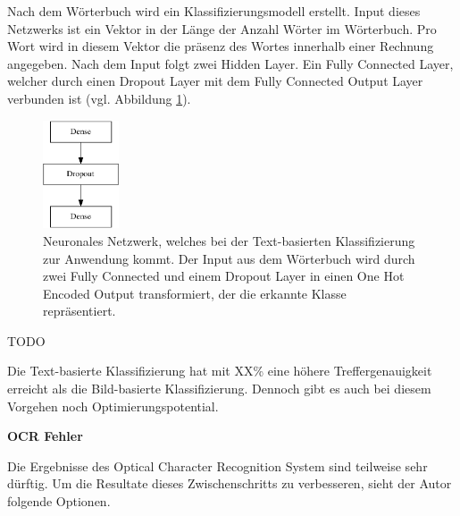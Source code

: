 Nach dem Wörterbuch wird ein Klassifizierungsmodell erstellt. Input dieses Netzwerks ist ein Vektor in der Länge der Anzahl Wörter im Wörterbuch. Pro Wort wird in diesem Vektor die präsenz des Wortes innerhalb einer Rechnung angegeben. Nach dem Input folgt zwei Hidden Layer. Ein Fully Connected Layer, welcher durch einen Dropout Layer mit dem Fully Connected Output Layer verbunden ist (vgl. Abbildung \ref{text-classification-model}). 

\begin{figure} 
    \caption{Neuronales Netzwerk, welches bei der Text-basierten Klassifizierung zur Anwendung kommt. Der Input aus dem Wörterbuch wird durch zwei Fully Connected und einem Dropout Layer in einen One Hot Encoded Output transformiert, der die erkannte Klasse repräsentiert.}
    \label{text-classification-model}
    \centering
    \includegraphics[width=0.2\textwidth]{graphics/text-classification/model.pdf}
\end{figure}


TODO




Die Text-basierte Klassifizierung hat mit XX\% eine höhere Treffergenauigkeit erreicht als die Bild-basierte Klassifizierung. Dennoch gibt es auch bei diesem Vorgehen noch Optimierungspotential.

\textbf{OCR Fehler}

Die Ergebnisse des Optical Character Recognition System sind teilweise sehr dürftig. Um die Resultate dieses Zwischenschritts zu verbesseren, sieht der Autor folgende Optionen.

